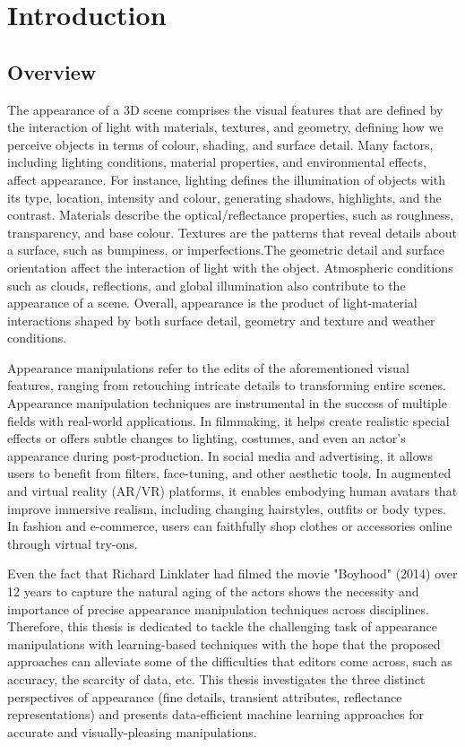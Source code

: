 \chapter{Introduction}






\section{Overview} 

The appearance of a 3D scene comprises the visual features that are defined by the interaction of light with materials, textures, and geometry, defining how we perceive objects in terms of colour, shading, and surface detail. Many factors, including lighting conditions, material properties, and environmental effects, affect appearance. For instance, lighting defines the illumination of objects with its type, location, intensity and colour, generating shadows, highlights, and the contrast. Materials describe the optical/reflectance properties, such as roughness, transparency, and base colour. Textures are the patterns that reveal details about a surface, such as bumpiness, or imperfections.The geometric detail and surface orientation affect the interaction of light with the object. Atmospheric conditions such as clouds, reflections, and global illumination also contribute to the appearance of a scene. Overall, appearance is the product of light-material interactions shaped by both surface detail, geometry and texture and weather conditions. 
 
Appearance manipulations refer to the edits of the aforementioned visual features, ranging from retouching intricate details to transforming entire scenes. Appearance manipulation techniques are instrumental in the success of multiple fields with real-world applications. In filmmaking, it helps create realistic special effects or offers subtle changes to lighting, costumes, and even an actor’s appearance during post-production. In social media and advertising, it allows users to benefit from filters, face-tuning, and other aesthetic tools. In augmented and virtual reality (AR/VR) platforms, it enables embodying human avatars that improve immersive realism, including changing hairstyles, outfits or body types. In fashion and e-commerce, users can faithfully shop clothes or accessories online through virtual try-ons. 

Even the fact that Richard Linklater had filmed the movie "Boyhood" (2014) over 12 years to capture the natural aging of the actors shows the necessity and importance of precise appearance manipulation techniques across disciplines. Therefore, this thesis is dedicated to tackle the challenging task of appearance manipulations with learning-based techniques with the hope that the proposed approaches can alleviate some of the difficulties that editors come across, such as accuracy, the scarcity of data, etc. This thesis investigates the three distinct perspectives of appearance (fine details, transient attributes, reflectance representations) and presents data-efficient machine learning approaches for accurate and visually-pleasing manipulations.

